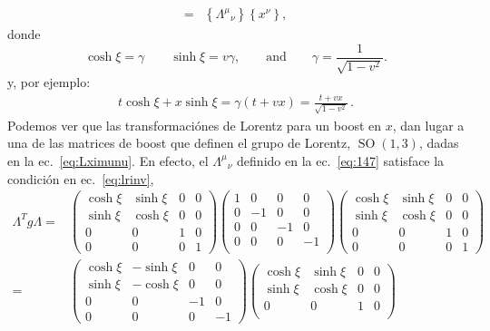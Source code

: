 \begin{frame}
\begin{align}
=&\left\{{\Lambda^\mu}_{\nu}\right\}\left\{x^\nu\right\},
\end{align}
donde
\begin{equation}
  \cosh\xi=\gamma\qquad\sinh\xi=v\gamma,\qquad\text{and}\qquad \gamma=\frac{1}{\sqrt{1-v^2}}.
\end{equation}
y, por ejemplo:
\begin{align}
  t\cosh{\xi}+x\sinh\xi=\gamma(t+v x)=\frac{t+v x}{\sqrt{1-v^2}}\,.
\end{align}
Podemos ver que las transformaciónes de Lorentz para un boost en $x$, dan lugar a una de las matrices de boost que definen el grupo de Lorentz, $\operatorname{SO}(1,3)$, dadas en la ec.~\eqref{eq:Lximunu}. En efecto, el ${\Lambda^\mu}_{\nu}$ definido en la ec.~\eqref{eq:147} satisface la condición en ec.~\eqref{eq:lrinv}, 
\begin{align}
  \label{eq:boostx}
  \Lambda^T g \Lambda=&\begin{pmatrix}
    \cosh\xi&\sinh\xi&0&0\\
    \sinh\xi&\cosh\xi&0&0\\
    0     &  0  &1&0\\
    0     &  0  &0&1
  \end{pmatrix}
  \begin{pmatrix}
    1 & 0  & 0 &0\\
    0 & -1 & 0 &0\\
    0 & 0  & -1&0\\
    0 & 0  & 0 &-1\\
  \end{pmatrix}
  \begin{pmatrix}
    \cosh\xi&\sinh\xi&0&0\\
    \sinh\xi&\cosh\xi&0&0\\
    0     &  0  &1&0\\
    0     &  0  &0&1
  \end{pmatrix}\nonumber\\
  =&\begin{pmatrix}
       \cosh\xi&-\sinh\xi&0&0\\
    \sinh\xi&-\cosh\xi&0&0\\
    0     &  0  &-1&0\\
    0     &  0  &0&-1
  \end{pmatrix}
 \begin{pmatrix}
    \cosh\xi&\sinh\xi&0&0\\
    \sinh\xi&\cosh\xi&0&0\\
    0     &  0  &1&0\\

\end{pmatrix}
\end{align}
\end{frame}
